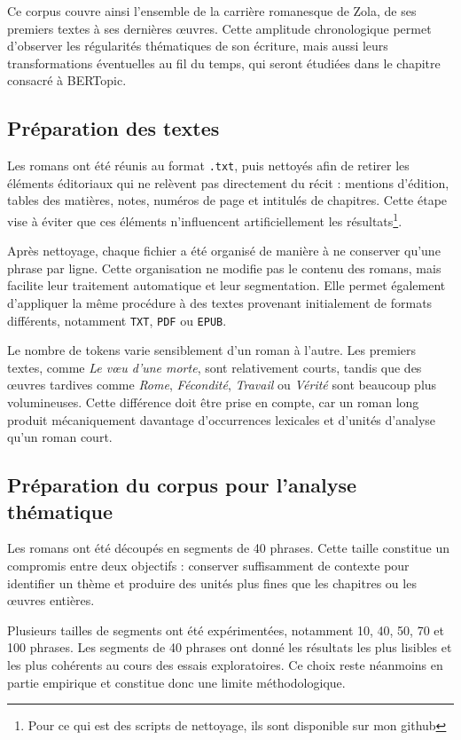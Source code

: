 Ce corpus couvre ainsi l'ensemble de la carrière romanesque de Zola, de ses premiers textes à ses dernières œuvres. Cette amplitude chronologique permet d'observer les régularités thématiques de son écriture, mais aussi leurs transformations éventuelles au fil du temps, qui seront étudiées dans le chapitre consacré à BERTopic.

\subsection{Préparation des textes}

Les romans ont été réunis au format \texttt{.txt}, puis nettoyés afin de retirer les éléments éditoriaux qui ne relèvent pas directement du récit : mentions d'édition, tables des matières, notes, numéros de page et intitulés de chapitres. Cette étape vise à éviter que ces éléments n'influencent artificiellement les résultats\footnote{Pour ce qui est des scripts de nettoyage, ils sont disponible sur mon github}.

Après nettoyage, chaque fichier a été organisé de manière à ne conserver qu'une phrase par ligne. Cette organisation ne modifie pas le contenu des romans, mais facilite leur traitement automatique et leur segmentation. Elle permet également d'appliquer la même procédure à des textes provenant initialement de formats différents, notamment \texttt{TXT}, \texttt{PDF} ou \texttt{EPUB}.

Le nombre de tokens varie sensiblement d'un roman à l'autre. Les premiers textes, comme \textit{Le vœu d'une morte}, sont relativement courts, tandis que des œuvres tardives comme \textit{Rome}, \textit{Fécondité}, \textit{Travail} ou \textit{Vérité} sont beaucoup plus volumineuses. Cette différence doit être prise en compte, car un roman long produit mécaniquement davantage d'occurrences lexicales et d'unités d'analyse qu'un roman court.

\subsection{Préparation du corpus pour l'analyse thématique}

Les romans ont été découpés en segments de 40 phrases. Cette taille constitue un compromis entre deux objectifs : conserver suffisamment de contexte pour identifier un thème et produire des unités plus fines que les chapitres ou les œuvres entières.

Plusieurs tailles de segments ont été expérimentées, notamment 10, 40, 50, 70 et 100 phrases. Les segments de 40 phrases ont donné les résultats les plus lisibles et les plus cohérents au cours des essais exploratoires. Ce choix reste néanmoins en partie empirique et constitue donc une limite méthodologique.

